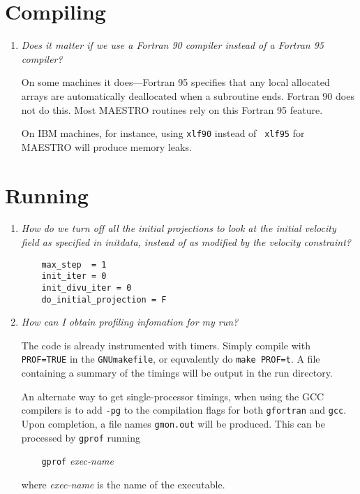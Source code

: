 \section{Compiling}

\begin{enumerate}

\item {\em Does it matter if we use a Fortran 90 compiler instead of a 
   Fortran 95 compiler?}


   On some machines it does---Fortran 95 specifies that any local
   allocated arrays are automatically deallocated when a subroutine
   ends.  Fortran 90 does not do this.  Most MAESTRO routines rely 
   on this Fortran 95 feature.  

   On IBM machines, for instance, using {\tt xlf90} instead of {\tt
     xlf95} for MAESTRO will produce memory leaks.

  

\end{enumerate}

\section{Running}

\begin{enumerate}

\item {\em  How do we turn off all the initial projections to look at the
   initial velocity field as specified in initdata, instead of as
   modified by the velocity constraint?} 
%
\begin{verbatim}
    max_step  = 1
    init_iter = 0
    init_divu_iter = 0
    do_initial_projection = F
\end{verbatim}



\item {\em How can I obtain profiling infomation for my run?}

  The code is already instrumented with timers.  Simply compile with
  {\tt PROF=TRUE} in the {\tt GNUmakefile}, or equvalently do 
  {\tt make PROF=t}.  A file containing a summary of the timings will
  be output in the run directory.

  An alternate way to get single-processor timings, when using 
  the GCC compilers is to add {\tt -pg} to the compilation flags
  for both {\tt gfortran} and {\tt gcc}.  Upon completion, a
  file names {\tt gmon.out} will be produced.  This can be 
  processed by {\tt gprof} running 

  {\tt~~~ gprof} {\em exec-name}
  
  where {\em exec-name} is the name of the executable.

\end{enumerate}




